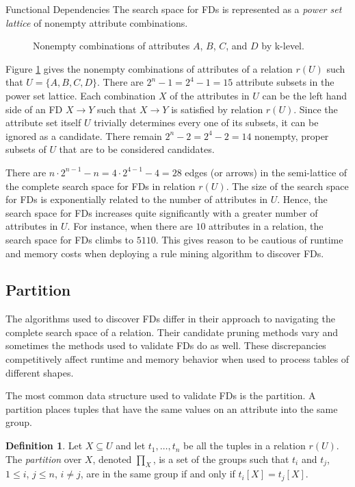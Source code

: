 \documentclass[6pt,twoside]{article}
\theoremstyle{plain}
\theoremstyle{definition}
\newtheorem{defn}{Definition}[section]
\begin{document}
\begin{section}{Functional Dependencies}
The search space for FDs is represented as a \textit{power set lattice} of nonempty attribute combinations.

\begin{figure}[h]
	\centering
	\textbf{\label{Fig. 1}}
	\caption{Nonempty combinations of attributes $A$, $B$, $C$, and $D$ by k-level.}
	\label{fig:lattice}
\end{figure}

Figure \ref{fig:lattice} gives the nonempty combinations of attributes of a relation $r(U)$ such that $U = \{ A, B, C, D\}$. There are $2^{n} - 1 = 2^{4} - 1 = 15$ attribute subsets in the power set lattice. Each combination $X$ of the attributes in $U$ can be the left hand side of an FD $X \rightarrow Y$ such that $X \rightarrow Y$ is satisfied by relation $r(U)$. Since the attribute set itself $U$ trivially determines every one of its subsets, it can be ignored as a candidate. There remain $2^{n}-2 = 2^{4} - 2 = 14$ nonempty, proper subsets of $U$ that are to be considered candidates.

There are $n \cdot 2^{n-1}-n=4 \cdot 2^{4-1}-4 = 28$ edges (or arrows) in the semi-lattice of the complete search space for FDs in relation $r(U)$. The size of the search space for FDs is exponentially related to the number of attributes in $U$. Hence, the search space for FDs increases quite significantly with a greater number of attributes in $U$. For instance, when there are $10$ attributes in a relation, the search space for FDs climbs to $5110$. This gives reason to be cautious of runtime and memory costs when deploying a rule mining algorithm to discover FDs.


\subsection[Partition]{Partition}

The algorithms used to discover FDs differ in their approach to navigating the complete search space of a relation. Their candidate pruning methods vary and sometimes the methods used to validate FDs do as well. These discrepancies competitively affect runtime and memory behavior when used to process tables of different shapes. 

The most common data structure used to validate FDs is the partition. A partition places tuples that have the same values on an attribute into the same group. 

\begin{defn}
	\label{partition}
	Let $X \subseteq U$ and let $t_1, \ldots , t_n$ be all the tuples in a relation $r(U)$. The \textit{partition} over $X$, denoted $\prod_X$, is a set of the groups such that $t_i$ and $t_j$, $1 \leq i$, $j \leq n$, $i \neq j$, are in the same group if and only if $t_i\left[X\right]=t_j\left[X\right]$.
\end{defn}


\end{section}
\end{document}
